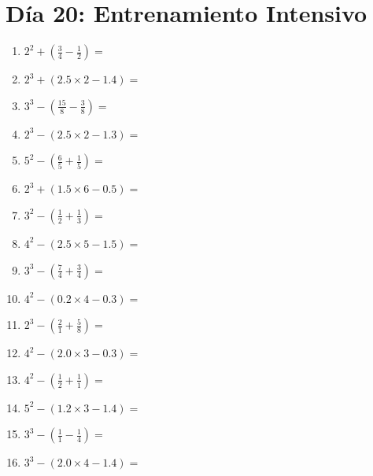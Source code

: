 \documentclass[12pt]{article}
\begin{document}
\section*{Día 20: Entrenamiento Intensivo}
\begin{enumerate}
\item \large $ 2^{2} + (\frac{3}{4} - \frac{1}{2}) = $ \vspace{1.6cm}
\item \large $ 2^{3} + (2.5 \times 2 - 1.4) = $ \vspace{1.6cm}
\item \large $ 3^{3} - (\frac{15}{8} - \frac{3}{8}) = $ \vspace{1.6cm}
\item \large $ 2^{3} - (2.5 \times 2 - 1.3) = $ \vspace{1.6cm}
\item \large $ 5^{2} - (\frac{6}{5} + \frac{1}{5}) = $ \vspace{1.6cm}
\item \large $ 2^{3} + (1.5 \times 6 - 0.5) = $ \vspace{1.6cm}
\item \large $ 3^{2} - (\frac{1}{2} + \frac{1}{3}) = $ \vspace{1.6cm}
\item \large $ 4^{2} - (2.5 \times 5 - 1.5) = $ \vspace{1.6cm}
\item \large $ 3^{3} - (\frac{7}{4} + \frac{3}{4}) = $ \vspace{1.6cm}
\item \large $ 4^{2} - (0.2 \times 4 - 0.3) = $ \vspace{1.6cm}
\newpage
\item \large $ 2^{3} - (\frac{2}{1} + \frac{5}{8}) = $ \vspace{1.6cm}
\item \large $ 4^{2} - (2.0 \times 3 - 0.3) = $ \vspace{1.6cm}
\item \large $ 4^{2} - (\frac{1}{2} + \frac{1}{1}) = $ \vspace{1.6cm}
\item \large $ 5^{2} - (1.2 \times 3 - 1.4) = $ \vspace{1.6cm}
\item \large $ 3^{3} - (\frac{1}{1} - \frac{1}{4}) = $ \vspace{1.6cm}
\item \large $ 3^{3} - (2.0 \times 4 - 1.4) = $ \vspace{1.6cm}

\end{enumerate}
\end{document}
